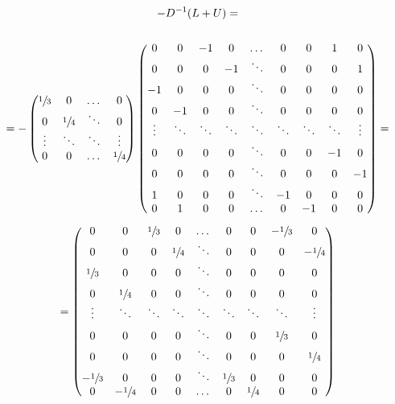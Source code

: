 \documentclass[12pt]{article}
\newcommand{\T}{\sfrac{1}{3}} %
\newcommand{\F}{\sfrac{1}{4}} %
\begin{document}
\begin{align*}
\begin{gathered}
-D^{-1}(L+U)=\\\\
=-\begin{pmatrix}
    \T      & 0       & \dots   & 0       \\
    0       & \F      & \ddots  & 0       \\
    \vdots  & \ddots  & \ddots  & \vdots  \\
    0       & 0       & \dots   & \F
\end{pmatrix}
\begin{pmatrix}
    0       & 0       & -1      & 0       & \dots   & 0       & 0       & 1       & 0       \\
    0       & 0       & 0       & -1      & \ddots  & 0       & 0       & 0       & 1       \\
    -1      & 0       & 0       & 0       & \ddots  & 0       & 0       & 0       & 0       \\
    0       & -1      & 0       & 0       & \ddots  & 0       & 0       & 0       & 0       \\
    \vdots  & \ddots  & \ddots  & \ddots  & \ddots  & \ddots  & \ddots  & \ddots  & \vdots  \\
    0       & 0       & 0       & 0       & \ddots  & 0       & 0       & -1      & 0       \\
    0       & 0       & 0       & 0       & \ddots  & 0       & 0       & 0       & -1      \\
    1       & 0       & 0       & 0       & \ddots  & -1      & 0       & 0       & 0       \\
    0       & 1       & 0       & 0       & \dots   & 0       & -1      & 0       & 0
\end{pmatrix}=\\\\
=\begin{pmatrix}
    0       & 0       & \T      & 0       & \dots   & 0       & 0       & -\T     & 0       \\
    0       & 0       & 0       & \F      & \ddots  & 0       & 0       & 0       & -\F     \\
    \T      & 0       & 0       & 0       & \ddots  & 0       & 0       & 0       & 0       \\
    0       & \F      & 0       & 0       & \ddots  & 0       & 0       & 0       & 0       \\
    \vdots  & \ddots  & \ddots  & \ddots  & \ddots  & \ddots  & \ddots  & \ddots  & \vdots  \\
    0       & 0       & 0       & 0       & \ddots  & 0       & 0       & \T      & 0       \\
    0       & 0       & 0       & 0       & \ddots  & 0       & 0       & 0       & \F      \\
    -\T     & 0       & 0       & 0       & \ddots  & \T      & 0       & 0       & 0       \\
    0       & -\F     & 0       & 0       & \dots   & 0       & \F      & 0       & 0
\end{pmatrix}
\end{gathered}
\end{align*}
\end{document}
